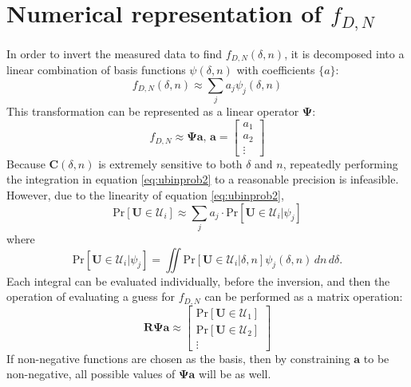 \documentclass[journal]{IEEEtran}
\begin{document}
\section{Numerical representation of $f_{\scriptscriptstyle{D, N}}$}
In order to invert the measured data to find $f_{\scriptscriptstyle{D, N}}(\delta, n)$, it is decomposed into a linear combination of basis functions ${\psi(\delta, n)}$ with coefficients $\{a\}$:
\begin{equation}
    f_{\scriptscriptstyle{D, N}}(\delta, n)\approx\sum_{j}a_j\psi_{j}(\delta, n)
\end{equation}
This transformation can be represented as a linear operator $\bm{\Psi}$:
\begin{equation}
    f_{\scriptscriptstyle{D, N}}\approx\bm{\Psi}\mathbf{a}\textrm{, }\mathbf{a}=\begin{bmatrix}a_1\\a_2\\\vdots\end{bmatrix}
\end{equation}
Because $\mathbf{C}(\delta, n)$ is extremely sensitive to both $\delta$ and $n$, repeatedly performing the integration in equation \ref{eq:ubinprob2} to a reasonable precision is infeasible. However, due to the linearity of equation \ref{eq:ubinprob2}, 
\begin{equation}
    \mathrm{Pr}[\mathbf{U}\in \mathcal{U}_i]\approx\sum_j a_j\cdot\mathrm{Pr}[\mathbf{U}\in \mathcal{U}_i|\psi_j]
\end{equation}
where
\begin{equation}\label{eq:rpsi}
    \mathrm{Pr}[\mathbf{U}\in \mathcal{U}_i|\psi_j]=\iint \mathrm{Pr}[\mathbf{U}\in\mathcal{U}_i|\delta, n]\psi_j(\delta, n)\,dn\,d\delta.
\end{equation}
Each integral can be evaluated individually, before the inversion, and then the operation of evaluating a guess for $f_{\scriptscriptstyle{D, N}}$ can be performed as a matrix operation:
\begin{equation}
    \bm{R}\bm{\Psi}\mathbf{a}\approx\begin{bmatrix}
        \mathrm{Pr}[\mathbf{U}\in\mathcal{U}_1]\\
        \mathrm{Pr}[\mathbf{U}\in\mathcal{U}_2]\\
        \vdots
    \end{bmatrix}
\end{equation}
If non-negative functions are chosen as the basis, then by constraining $\mathbf{a}$ to be non-negative, all possible values of $\bm{\Psi}\mathbf{a}$ will be as well.
\end{document}

